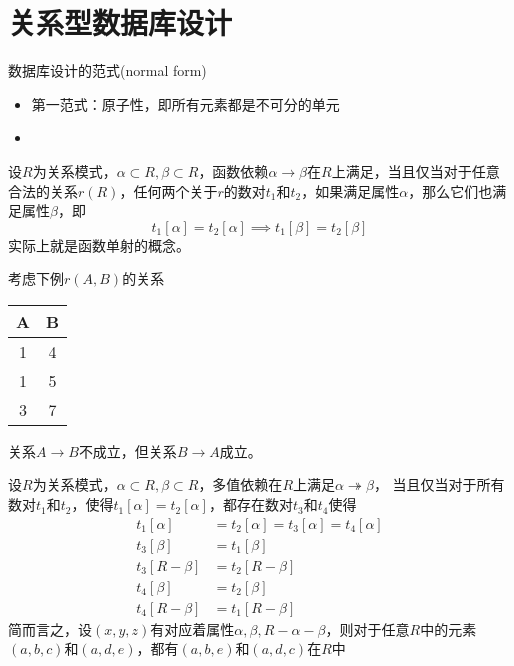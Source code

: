 
\section{关系型数据库设计}
数据库设计的范式(normal form)
\begin{itemize}
	\item 第一范式：原子性，即所有元素都是不可分的单元
	\item 
\end{itemize}

\begin{definition}
设$R$为关系模式，$\alpha\subset R,\beta\subset R$，函数依赖$\alpha\to\beta$在$R$上满足，当且仅当对于任意合法的关系$r(R)$，任何两个关于$r$的数对$t_1$和$t_2$，如果满足属性$\alpha$，那么它们也满足属性$\beta$，即
\[t_1[\alpha]=t_2[\alpha]\implies t_1[\beta]=t_2[\beta]\]
实际上就是函数单射的概念。
\end{definition}
考虑下例$r(A,B)$的关系
\begin{center}
\begin{tabular}{|c|c|}\hline
A & B\\\hline
1 & 4\\\hline
1 & 5\\\hline
3 & 7\\\hline
\end{tabular}
\end{center}
关系$A\to B$不成立，但关系$B\to A$成立。

\begin{definition}
设$R$为关系模式，$\alpha\subset R,\beta\subset R$，多值依赖在$R$上满足$\alpha\twoheadrightarrow\beta$，
当且仅当对于所有数对$t_1$和$t_2$，使得$t_1[\alpha]=t_2[\alpha]$，都存在数对$t_3$和$t_4$使得
\[\begin{aligned}
\displaystyle t_{1}[\alpha ]&= t_{2}[\alpha ]=t_{3}[\alpha ]=t_{4}[\alpha ]\\
\displaystyle t_{3}[\beta ]&= t_{1}[\beta ]\\
\displaystyle t_{3}[R-\beta ]&= t_{2}[R-\beta ]\\
\displaystyle t_{4}[\beta ]&= t_{2}[\beta ]\\
\displaystyle t_{4}[R-\beta ]&= t_{1}[R-\beta ]
\end{aligned}\]
简而言之，设${\displaystyle (x,y,z)}$有对应着属性${\displaystyle \alpha ,}{\displaystyle \beta ,}{\displaystyle R-\alpha -\beta }$，则对于任意$R$中的元素${\displaystyle (a,b,c)}$和${\displaystyle (a,d,e)}$，都有${\displaystyle (a,b,e)}$和${\displaystyle (a,d,c)}$在$R$中
\end{definition}